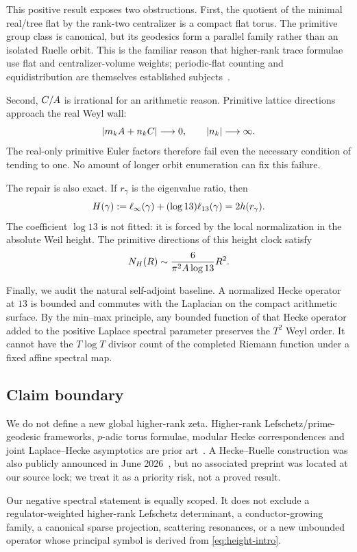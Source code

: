 This positive result exposes two obstructions.  First, the quotient of the
minimal real/tree flat by the rank-two centralizer is a compact flat torus.
The primitive group class is canonical, but its geodesics form a parallel
family rather than an isolated Ruelle orbit.  This is the familiar reason
that higher-rank trace formulae use flat and centralizer-volume weights;
periodic-flat counting and equidistribution are themselves established
subjects~\cite{Deitmar2004,DangLi2022,Khayutin2019}.

Second, $C/A$ is irrational for an arithmetic reason.  Primitive lattice
directions approach the real Weyl wall:
\[
 |m_kA+n_kC|\longrightarrow0,
 \qquad |n_k|\longrightarrow\infty.
\]
The real-only primitive Euler factors therefore fail even the necessary
condition of tending to one.  No amount of longer orbit enumeration can fix
this failure.

The repair is also exact.  If $r_\gamma$ is the eigenvalue ratio, then
\begin{equation}\label{eq:height-intro}
 H(\gamma):=\ell_{\infty}(\gamma)+(\log13)\ell_{13}(\gamma)=2h(r_\gamma).
\end{equation}
The coefficient $\log13$ is not fitted: it is forced by the local
normalization in the absolute Weil height.  The primitive directions of this
height clock satisfy
\[
 N_H(R)\sim\frac{6}{\pi^2A\log13}R^2.
\]

Finally, we audit the natural self-adjoint baseline.  A normalized Hecke
operator at $13$ is bounded and commutes with the Laplacian on the compact
arithmetic surface.  By the min--max principle, any bounded function of that
Hecke operator added to the positive Laplace spectral parameter preserves
the $T^2$ Weyl order.  It cannot have the $T\log T$ divisor count of the
completed Riemann function under a fixed affine spectral map.

\subsection{Claim boundary}

We do not define a new global higher-rank zeta.  Higher-rank
Lefschetz/prime-geodesic frameworks, $p$-adic torus formulae, modular Hecke
correspondences and joint Laplace--Hecke asymptotics are prior
art~\cite{Deitmar2004,DangLi2022,Deitmar2007,DeitmarKang2014,AkiyamaTanigawa1990,RamacherWakatsuki2022}.
A Hecke--Ruelle construction was also publicly announced in June
2026~\cite{SongTalk2026}, but no associated preprint was located at our
source lock; we treat it as a priority risk, not a proved result.

Our negative spectral statement is equally scoped.  It does not exclude a
regulator-weighted higher-rank Lefschetz determinant, a conductor-growing
family, a canonical sparse projection, scattering resonances, or a new
unbounded operator whose principal symbol is derived from
\eqref{eq:height-intro}.

